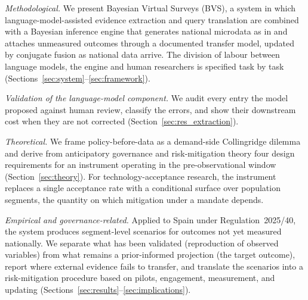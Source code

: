 \emph{Methodological.} We present Bayesian Virtual Surveys (BVS), a system in
which language-model-assisted evidence extraction and query translation are
combined with a Bayesian inference engine that generates national microdata as
in \citet{martins2024} and attaches unmeasured outcomes through a documented
transfer model, updated by conjugate fusion as national data arrive. The
division of labour between language models, the engine and human researchers
is specified task by task (Sections~\ref{sec:system}--\ref{sec:framework}).

\emph{Validation of the language-model component.} We audit every entry the
model proposed against human review, classify the errors, and show their
downstream cost when they are not corrected (Section~\ref{sec:res_extraction}).

\emph{Theoretical.} We frame policy-before-data as a demand-side Collingridge
dilemma and derive from anticipatory governance and risk-mitigation theory four
design requirements for an instrument operating in the pre-observational window
(Section~\ref{sec:theory}). For technology-acceptance research, the instrument
replaces a single acceptance rate with a conditional surface over population
segments, the quantity on which mitigation under a mandate depends.

\emph{Empirical and governance-related.} Applied to Spain under
Regulation~2025/40, the system produces segment-level scenarios for outcomes
not yet measured nationally. We separate what has been validated (reproduction
of observed variables) from what remains a prior-informed projection (the
target outcome), report where external evidence fails to transfer, and
translate the scenarios into a risk-mitigation procedure based on pilots,
engagement, measurement, and updating
(Sections~\ref{sec:results}--\ref{sec:implications}).

